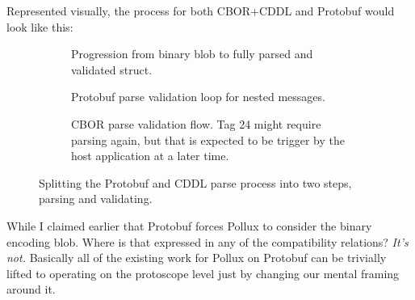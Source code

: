 \documentclass[11pt]{article}
\theoremstyle{definition}
\theoremstyle{plain}
\begin{document}
Represented visually, the process for both CBOR+CDDL and Protobuf would look
like this:

\begin{figure}[H]
  \centering
  \begin{subfigure}[b]{\textwidth}
    \centering
    \caption{Progression from binary blob to fully parsed and validated struct.}
  \end{subfigure}

  \begin{subfigure}[b]{0.4\textwidth}
    \centering
    \caption{Protobuf parse validation loop for nested messages.}
  \end{subfigure}
  \hspace{1cm}
  \begin{subfigure}[b]{0.4\textwidth}
    \centering
    \caption{CBOR parse validation flow. Tag 24 might require parsing again, but
    that is expected to be trigger by the host application at a later time.}
  \end{subfigure}

  \caption{Splitting the Protobuf and CDDL parse process into two steps, parsing
    and validating.}
  \label{fig:parse-validate}
\end{figure}

While I claimed earlier that Protobuf forces Pollux to consider the binary
encoding blob. Where is that expressed in any of the compatibility relations?
\emph{It's not.} Basically all of the existing work for Pollux on Protobuf can
be trivially lifted to operating on the protoscope level just by changing our
mental framing around it.
\end{document}
